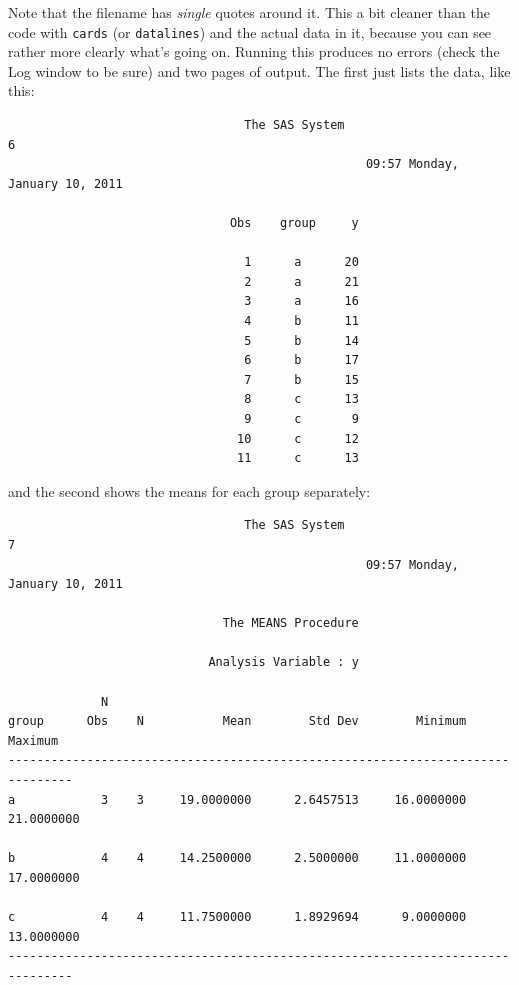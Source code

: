 \documentclass[11pt]{article}
\begin{document}
Note that the filename has {\em single} quotes around it. This a bit
cleaner than the code with \verb-cards- (or \verb-datalines-) and the
actual data in it, because you can see rather more clearly what's
going on. Running this produces no errors (check the Log window to be
sure) and two pages of output. The first just lists the data, like
this:

\filbreak
{\small
\begin{verbatim}
                                 The SAS System                                6
                                                  09:57 Monday, January 10, 2011

                               Obs    group     y

                                 1      a      20
                                 2      a      21
                                 3      a      16
                                 4      b      11
                                 5      b      14
                                 6      b      17
                                 7      b      15
                                 8      c      13
                                 9      c       9
                                10      c      12
                                11      c      13
\end{verbatim}
}
\filbreak

and the second shows the means for each group separately:

\filbreak
{\small
\begin{verbatim}
                                 The SAS System                                7
                                                  09:57 Monday, January 10, 2011

                              The MEANS Procedure

                            Analysis Variable : y

             N
group      Obs    N           Mean        Std Dev        Minimum        Maximum
-------------------------------------------------------------------------------
a            3    3     19.0000000      2.6457513     16.0000000     21.0000000

b            4    4     14.2500000      2.5000000     11.0000000     17.0000000

c            4    4     11.7500000      1.8929694      9.0000000     13.0000000
-------------------------------------------------------------------------------

\end{verbatim}
}
\filbreak
\end{document}
